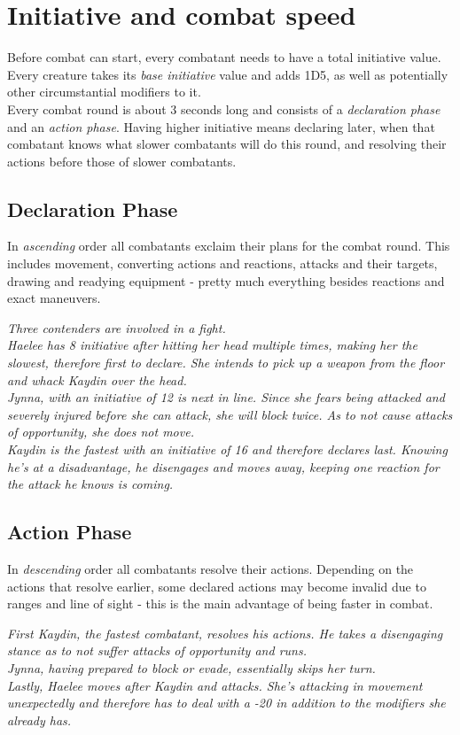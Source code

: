 \section{Initiative and combat speed}
Before combat can start, every combatant needs to have a total initiative value.
Every creature takes its \emph{base initiative} value
	and adds 1D5,
	as well as potentially other circumstantial modifiers to it.\\
Every combat round is about 3 seconds long and consists of a \textit{declaration phase} and an \textit{action phase}.
Having higher initiative means declaring later,
	when that combatant knows what slower combatants will do this round,
	and resolving their actions before those of slower combatants.
\subsection{Declaration Phase}
In \emph{ascending} order all combatants exclaim their plans for the combat round.
This includes movement, converting actions and reactions, attacks and their targets, drawing and readying equipment
	- pretty much everything besides reactions and exact maneuvers.
\begin{exampleblock}
	\itshape
	Three contenders are involved in a fight.\\
	Haelee has 8 initiative after hitting her head multiple times, making her the slowest, therefore first to declare. She intends to pick up a weapon from the floor and whack Kaydin over the head.\\
	Jynna, with an initiative of 12 is next in line. Since she fears being attacked and severely injured before she can attack, she will block twice. As to not cause attacks of opportunity, she does not move.\\
	Kaydin is the fastest with an initiative of 16 and therefore declares last. Knowing he's at a disadvantage, he disengages and moves away, keeping one reaction for the attack he knows is coming.
\end{exampleblock}
\subsection{Action Phase}
In \emph{descending} order all combatants resolve their actions.
Depending on the actions that resolve earlier,
	some declared actions may become invalid due to ranges and line of sight
	- this is the main advantage of being faster in combat.
\begin{exampleblock}
	\itshape
	First Kaydin, the fastest combatant, resolves his actions. He takes a disengaging stance as to not suffer attacks of opportunity and runs.\\
	Jynna, having prepared to block or evade, essentially skips her turn.\\
	Lastly, Haelee moves after Kaydin and attacks. She's attacking in movement unexpectedly and therefore has to deal with a -20 in addition to the modifiers she already has.
\end{exampleblock}
